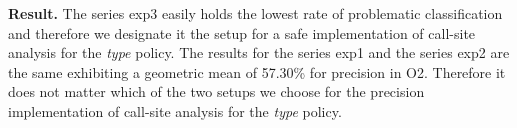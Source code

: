 \textbf{Result.} The series exp3 easily holds the lowest rate of problematic classification and therefore we designate it the setup for a safe implementation of call-site analysis for the \textit{type} policy. The results for the series exp1 and the series exp2 are the same exhibiting a geometric mean of 57.30\% for precision in O2. Therefore it does not matter which of the two setups we choose for the precision implementation of call-site analysis for the \textit{type} policy.

\begin{table}[h!]
\centering
{}
		\caption {The results for call-site analysis for exp1 and exp2 of the \textit{type} policy throughout different optimizations.}
		\label{tbl:CSexp12TYPE}
\end{table}


